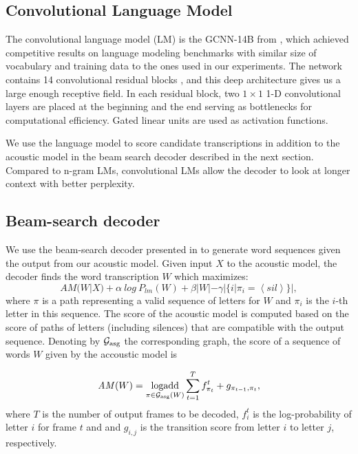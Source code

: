 \documentclass[a4paper]{article}
\DeclareMathOperator*{\logadd}{logadd}
\begin{document}
\subsection{Convolutional Language Model}
\label{sec:lm}
The convolutional language model (LM) is the GCNN-14B from \cite{glu}, which achieved competitive results on language modeling benchmarks with similar size of vocabulary and training data to the ones used in our experiments. The network contains 14 convolutional residual blocks \cite{resnet}, and this deep architecture gives us a large enough receptive field. In each residual block, two $1 \times 1$ 1-D convolutional layers are placed at the beginning and the end serving as bottlenecks for computational efficiency. Gated linear units are used as activation functions. 

We use the language model to score candidate transcriptions in addition to the acoustic model in the beam search decoder described in the next section. Compared to n-gram LMs, convolutional LMs allow the decoder to look at longer context with better perplexity. 


\subsection{Beam-search decoder}
\label{sec:beam}
We use the beam-search decoder presented in \cite{wav2letter2} to generate word sequences given the output from our acoustic model. Given input $X$ to the acoustic model, the decoder finds the word transcription $W$ which maximizes:
\begin{equation}
\label{eq:beamscore}
\mathit{AM} (W|X) + \alpha ~log~ P_{lm}(W) + \beta | W | - \gamma | \{ i | \pi_i = \left<sil\right> \}|,
\end{equation}
where $\pi$ is a path representing a valid sequence of letters for $W$ and $\pi_i$ is the $i$-th letter in this sequence.
The score of the acoustic model is computed based on the score of paths of letters (including silences) that are compatible with the output sequence. Denoting by $\mathcal{G}_{\rm asg}$ the corresponding graph, the score of a sequence of words $W$ given by the accoustic model is


\begin{equation}
\mathit{AM} (W) = \logadd_{\pi \in \mathcal{G}_{\rm asg}(W)} \sum_{t = 1}^T f_{\pi_t}^t + g_{\pi_{t-1}, \pi_t},
\end{equation}
where $T$ is the number of output frames to be decoded, $f_i^t$ is the log-probability of letter $i$ for frame $t$ and and $g_{i,j}$ is the transition score from letter $i$ to letter $j$, respectively. 
\end{document}
